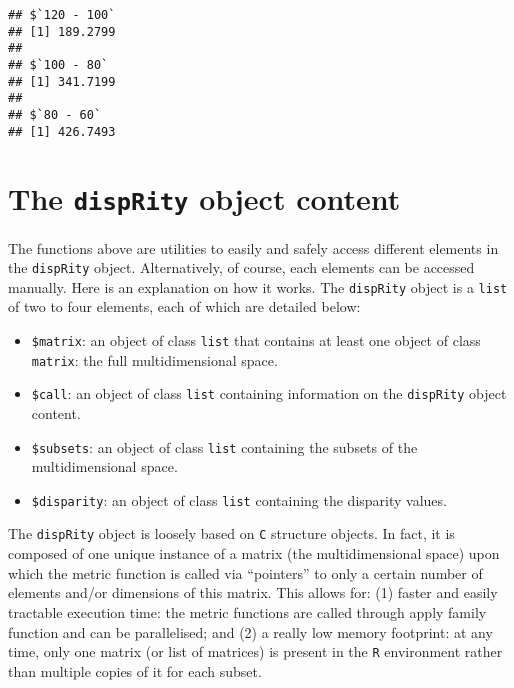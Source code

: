\documentclass[
]{book}
\newenvironment{Shaded}{\begin{snugshade}}{\end{snugshade}}
\newcommand{\CommentTok}[1]{\textcolor[rgb]{0.56,0.35,0.01}{\textit{#1}}}
\newcommand{\ControlFlowTok}[1]{\textcolor[rgb]{0.13,0.29,0.53}{\textbf{#1}}}
\newcommand{\KeywordTok}[1]{\textcolor[rgb]{0.13,0.29,0.53}{\textbf{#1}}}
\newcommand{\NormalTok}[1]{#1}
\newcommand{\OperatorTok}[1]{\textcolor[rgb]{0.81,0.36,0.00}{\textbf{#1}}}
\providecommand{\tightlist}{%
  \setlength{\itemsep}{0pt}\setlength{\parskip}{0pt}}
\begin{document}
\begin{Shaded}
\end{Shaded}

\begin{verbatim}
## $`120 - 100`
## [1] 189.2799
## 
## $`100 - 80`
## [1] 341.7199
## 
## $`80 - 60`
## [1] 426.7493
\end{verbatim}

\hypertarget{disprity-object}{%
\section{\texorpdfstring{The \texttt{dispRity} object content}{The dispRity object content}}\label{disprity-object}}

The functions above are utilities to easily and safely access different elements in the \texttt{dispRity} object.
Alternatively, of course, each elements can be accessed manually.
Here is an explanation on how it works.
The \texttt{dispRity} object is a \texttt{list} of two to four elements, each of which are detailed below:

\begin{itemize}
\tightlist
\item
  \texttt{\$matrix}: an object of class \texttt{list} that contains at least one object of class \texttt{matrix}: the full multidimensional space.
\item
  \texttt{\$call}: an object of class \texttt{list} containing information on the \texttt{dispRity} object content.
\item
  \texttt{\$subsets}: an object of class \texttt{list} containing the subsets of the multidimensional space.
\item
  \texttt{\$disparity}: an object of class \texttt{list} containing the disparity values.
\end{itemize}

The \texttt{dispRity} object is loosely based on \texttt{C} structure objects.
In fact, it is composed of one unique instance of a matrix (the multidimensional space) upon which the metric function is called via ``pointers'' to only a certain number of elements and/or dimensions of this matrix.
This allows for: (1) faster and easily tractable execution time: the metric functions are called through apply family function and can be parallelised; and (2) a really low memory footprint: at any time, only one matrix (or list of matrices) is present in the \texttt{R} environment rather than multiple copies of it for each subset.
\end{document}
